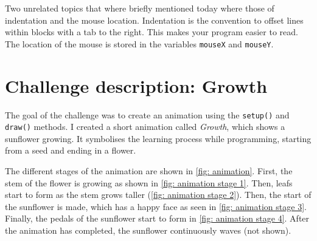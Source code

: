 Two unrelated topics that where briefly mentioned today where those of indentation and the mouse location. Indentation is the convention to offset lines within blocks with a tab to the right. This makes your program easier to read. The location of the mouse is stored in the variables \texttt{mouseX} and \texttt{mouseY}.


\section{Challenge description: Growth}

The goal of the challenge was to create an animation using the \texttt{setup()} and \texttt{draw()} methods. I created a short animation called \textit{Growth}, which shows a sunflower growing. It symbolises the learning process while programming, starting from a seed and ending in a flower.

\medskip

The different stages of the animation are shown in \cref{fig: animation}. First, the stem of the flower is growing as shown in \cref{fig: animation stage 1}. Then, leafs start to form as the stem grows taller (\cref{fig: animation stage 2}). Then, the start of the sunflower is made, which has a happy face as seen in \cref{fig: animation stage 3}. Finally, the pedals of the sunflower start to form in \cref{fig: animation stage 4}. After the animation has completed, the sunflower continuously waves (not shown).

